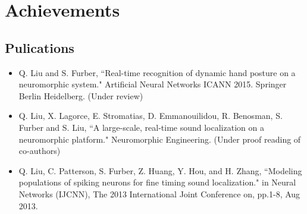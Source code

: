 
\section{Achievements }
\subsection{Pulications}
\begin{itemize}

	\item Q. Liu and S. Furber, ``Real-time recognition of dynamic hand posture on a neuromorphic system." Artificial Neural Networks ICANN 2015. Springer Berlin Heidelberg. (Under review)


	\item Q. Liu, X. Lagorce, E. Stromatias, D. Emmanouilidou, R. Benosman, S. Furber and S. Liu, ``A large-scale, real-time sound localization on a neuromorphic platform." Neuromorphic Engineering. (Under proof reading of co-authors)

	\item Q. Liu, C. Patterson, S. Furber, Z. Huang, Y. Hou, and H. Zhang, ``Modeling populations of spiking neurons for fine timing sound localization." in Neural Networks (IJCNN), The 2013 International Joint Conference on, pp.1-8, Aug 2013.
\end{itemize}
